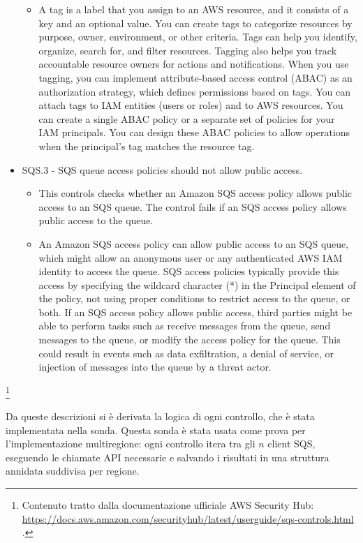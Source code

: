 \begin{mdframed}[backgroundcolor=gray!05, linecolor=gray!50]
\begin{itemize}
\begin{itemize}
        \item A tag is a label that you assign to an AWS resource, and it consists of a key and an optional value. You can create tags to categorize resources by purpose, owner, environment, or other criteria. Tags can help you identify, organize, search for, and filter resources. Tagging also helps you track accountable resource owners for actions and notifications. When you use tagging, you can implement attribute-based access control (ABAC) as an authorization strategy, which defines permissions based on tags. You can attach tags to IAM entities (users or roles) and to AWS resources. You can create a single ABAC policy or a separate set of policies for your IAM principals. You can design these ABAC policies to allow operations when the principal's tag matches the resource tag.
    \end{itemize}
    \item SQS.3 - SQS queue access policies should not allow public access.
    \begin{itemize}
        \item This controls checks whether an Amazon SQS access policy allows public access to an SQS queue. The control fails if an SQS access policy allows public access to the queue.
        \item An Amazon SQS access policy can allow public access to an SQS queue, which might allow an anonymous user or any authenticated AWS IAM identity to access the queue. SQS access policies typically provide this access by specifying the wildcard character (*) in the Principal element of the policy, not using proper conditions to restrict access to the queue, or both. If an SQS access policy allows public access, third parties might be able to perform tasks such as receive messages from the queue, send messages to the queue, or modify the access policy for the queue. This could result in events such as data exfiltration, a denial of service, or injection of messages into the queue by a threat actor.
    \end{itemize}
    \end{itemize}
\end{mdframed}
\footnote{Contenuto tratto dalla documentazione ufficiale AWS Security Hub: \url{https://docs.aws.amazon.com/securityhub/latest/userguide/sqs-controls.html} .}


Da queste descrizioni si è derivata la logica di ogni controllo, che è stata implementata nella sonda. Questa sonda è stata usata come prova per l'implementazione multiregione: ogni controllo itera tra gli $n$ client SQS, eseguendo le chiamate API necessarie e salvando i risultati in una struttura annidata suddivisa per regione.

